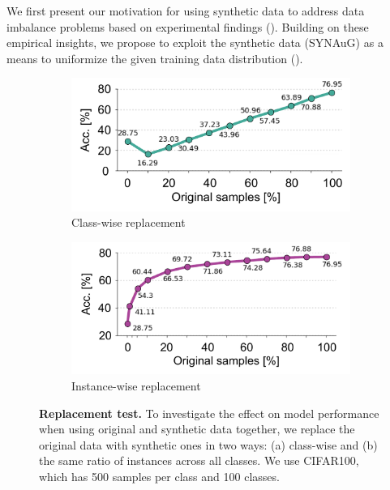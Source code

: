 
We first present our motivation for using synthetic data to address data imbalance problems based on experimental findings ().
Building on these empirical insights, we propose to exploit the synthetic data (SYNAuG) as a means to uniformize the given training data distribution 
().

\begin{figure}
    \centering
        \begin{subfigure}[b]{0.9\linewidth}
        \centering
        \includegraphics[width=1.0\linewidth]{figures/example1.pdf}
        \caption{Class-wise replacement}
        \label{fig:classwise}
    \end{subfigure}
    \centering
        \begin{subfigure}[b]{0.9\linewidth}
        \centering
        \includegraphics[width=1.0\linewidth]{figures/example2.pdf}
        \caption{Instance-wise replacement}
        \label{fig:instwise}
    \end{subfigure}    
    \caption{\textbf{Replacement test.} 
    To investigate the effect on model performance when using original and synthetic data together, we replace the original data with synthetic ones in two ways: (a) class-wise and (b) the same ratio of instances across all classes.
    We use CIFAR100, which has 500 samples per class and 100 classes.
    }
    \label{fig:abl_ratio}
\end{figure}

